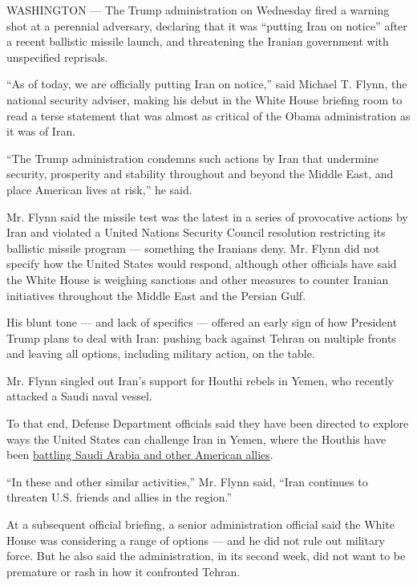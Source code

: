 WASHINGTON --- The Trump administration on Wednesday fired a warning
shot at a perennial adversary, declaring that it was ``putting Iran on
notice'' after a recent ballistic missile launch, and threatening the
Iranian government with unspecified reprisals.

``As of today, we are officially putting Iran on notice,'' said Michael
T. Flynn, the national security adviser, making his debut in the White
House briefing room to read a terse statement that was almost as
critical of the Obama administration as it was of Iran.

``The Trump administration condemns such actions by Iran that undermine
security, prosperity and stability throughout and beyond the Middle
East, and place American lives at risk,'' he said.

Mr. Flynn said the missile test was the latest in a series of
provocative actions by Iran and violated a United Nations Security
Council resolution restricting its ballistic missile program ---
something the Iranians deny. Mr. Flynn did not specify how the United
States would respond, although other officials have said the White House
is weighing sanctions and other measures to counter Iranian initiatives
throughout the Middle East and the Persian Gulf.

His blunt tone --- and lack of specifics --- offered an early sign of
how President Trump plans to deal with Iran: pushing back against Tehran
on multiple fronts and leaving all options, including military action,
on the table.

Mr. Flynn singled out Iran's support for Houthi rebels in Yemen, who
recently attacked a Saudi naval vessel.

To that end, Defense Department officials said they have been directed
to explore ways the United States can challenge Iran in Yemen, where the
Houthis have been
\href{https://www.nytimes.com/interactive/2016/10/14/world/middleeast/yemen-saudi-arabia-us-airstrikes.html}{battling
Saudi Arabia and other American allies}.

``In these and other similar activities,'' Mr. Flynn said, ``Iran
continues to threaten U.S. friends and allies in the region.''

At a subsequent official briefing, a senior administration official said
the White House was considering a range of options --- and he did not
rule out military force. But he also said the administration, in its
second week, did not want to be premature or rash in how it confronted
Tehran.

